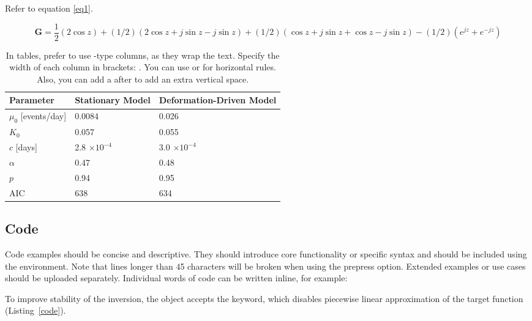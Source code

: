 \documentclass[breakmath,report,languages={french,japanese,arabic}]{seismica}
\begin{document}
Refer to equation \ref{eq1}.

\begin{equation} \label{eq1}
\mathbf{G} = \frac{1}{2}(2\cos z) + (1/2)(2\cos z+j\sin z-j\sin z) + (1/2)(\cos z+j\sin z+\cos z-j\sin z) -  (1/2)(e^{jz}+e^{-jz})
\end{equation}
	
\begin{table}[ht!]

\caption{In tables, prefer to use -type columns, as they wrap the text. Specify the width of each column in brackets: . You can use  or  for horizontal rules. Also, you can add a  after  to add an extra vertical space.} 
\label{tab:etas_parameters}

\begin{tabular}{ m{2.5cm} m{2.5cm} m{2.5cm}  } %
\textbf{Parameter} & \textbf{Stationary Model} & \textbf{Deformation-Driven Model} \\
\hline
\( \mu_0 \) [events/day] & 0.0084 & 0.026 \\
\( K_0 \)                & 0.057  & 0.055 \\
\( c \) [days]           & 2.8 \(\times 10^{-4}\) & 3.0 \(\times 10^{-4}\) \\
\( \alpha \)             & 0.47   & 0.48 \\
\( p \)                  & 0.94   & 0.95 \\
AIC                      & 638    & 634 \\
\end{tabular}
\end{table}

	\subsection{Code}

Code examples should be concise and descriptive. They should introduce core functionality or specific syntax and should be included using the  environment. Note that lines longer than 45 characters will be broken when using the prepress option. Extended examples or use cases should be uploaded separately. Individual words of code can be written inline, for example:

To improve stability of the inversion, the  object accepts the  keyword, which disables piecewise linear approximation of the target function (Listing~\ref{code}).
\end{document}

